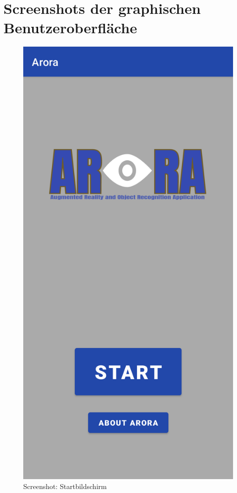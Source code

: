 \documentclass[oneside]{ausarbeitung}
\begin{document}
\chapter{Screenshots der graphischen Benutzeroberfläche}
\label{appendix:gui}
\begin{figure}[hptb]
	\centering
	\includegraphics[height=0.6\textheight]{images/screenshots/start-screen.png}
	\caption{Screenshot: Startbildschirm}
	\label{fig:screenshot:start}
\end{figure}
\end{document}
